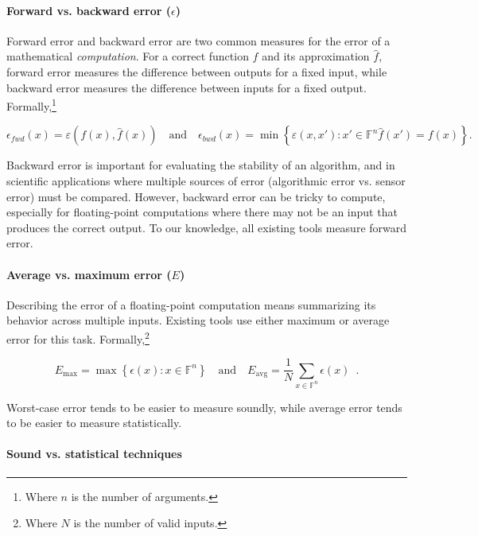 \documentclass[main.tex]{subfiles}
\begin{document}
\paragraph{Forward vs. backward error ($\epsilon$)}

Forward error and backward error are two common measures
  for the error of a mathematical \emph{computation}.
For a correct function $f$ and its approximation $\hat f$,
  forward error measures the difference between outputs for a fixed input,
  while backward error measures the difference between inputs
  for a fixed output.
Formally,\footnote{Where $n$ is the number of arguments.}

\begin{equation*}
  \epsilon_{fwd}(x) = \varepsilon(f(x), \hat{f}(x))
  \quad \text{and} \quad
  \epsilon_{bwd}(x) =
  \min \left\{ \varepsilon(x, x') : x' \in \mathbb{F}^n {\hat f}(x') = f(x) \right\}.
\end{equation*}

Backward error is important for evaluating the stability of an algorithm,
  and in scientific applications where multiple sources of error
  (algorithmic error vs. sensor error) must be compared.
However, backward error can be tricky to compute,
  especially for floating-point computations
  where there may not be an input that produces the correct output.
To our knowledge, all existing tools measure forward error.

\paragraph{Average vs. maximum error ($E$)}

Describing the error of a floating-point computation
  means summarizing its behavior across multiple inputs.
Existing tools use either maximum or average error for this task.
Formally,\footnote{Where $N$ is the number of valid inputs.}

\begin{equation*}
  E_{\text{max}} = \max \left\{\epsilon(x) : x \in \mathbb{F}^n\right\}
  \quad \text{and} \quad
  E_{\text{avg}} = \frac{1}{N} \sum_{x\in \mathbb{F}^n} \epsilon(x) \enspace .
\end{equation*}

Worst-case error tends to be easier to measure soundly,
  while average error tends to be easier to measure statistically.

\paragraph{Sound vs. statistical techniques}
\end{document}
